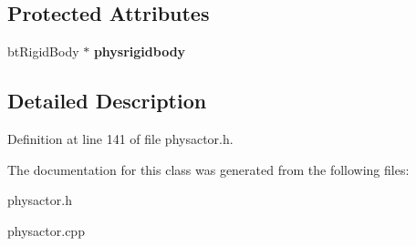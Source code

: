 \subsection*{Protected Attributes}
\begin{DoxyCompactItemize}
\item 
\hypertarget{classActorSta_ad12363fc4cd60d6cdd5e3c6d36d96f20}{
btRigidBody $\ast$ {\bfseries physrigidbody}}
\label{d3/daf/classActorSta_ad12363fc4cd60d6cdd5e3c6d36d96f20}

\end{DoxyCompactItemize}


\subsection{Detailed Description}


Definition at line 141 of file physactor.h.

The documentation for this class was generated from the following files:\begin{DoxyCompactItemize}
\item 
physactor.h\item 
physactor.cpp\end{DoxyCompactItemize}
